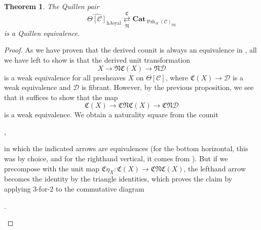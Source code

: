 \documentclass[a4paper]{article}
\numberwithin{equation}{subsection}
\theoremstyle{plain}   %
\newtheorem{thm}[equation]{Theorem}
\theoremstyle{definition}
\theoremstyle{remark}
\theoremstyle{plain}
\newcommand{\Cat}{\ensuremath{\mathbf{Cat}}}
\providecommand{\C}{}
\renewcommand{\C}{\ensuremath{\mathcal{C}}}
\newcommand{\cellset}{\ensuremath{\widehat{\Theta[\mathcal{C}]}}}
\newcommand{\spsh}{\ensuremath{\operatorname{Psh}_\Delta(\mathcal{C})}}
\begin{document}
\begin{thm}\label{mainthm1}
	The Quillen pair
	\[\cellset_{\mathrm{hJoyal}} \underset{\mathfrak{N}}{\overset{\mathfrak{C}}{\rightleftarrows}} \Cat_{\spsh_{\mathrm{inj}}}\]
	is a Quillen equivalence.
\end{thm}
\begin{proof}
	As we have proven that the derived counit is always an equivalence in , all we have left to show is that the derived unit transformation
	\[X\to \mathfrak{N}\mathfrak{C}(X) \to \mathfrak{N}\mathcal{D}\]
	is a weak equivalence for all presheaves \(X\) on \(\Theta[\C]\), where \(\mathfrak{C}(X) \to \mathcal{D}\) is a weak equivalence and \(\mathcal{D}\) is fibrant.  However, by the previous proposition, we see that it suffices to show that the map
	\[\mathfrak{C}(X)\to \mathfrak{C}\mathfrak{N}\mathfrak{C}(X) \to \mathfrak{C}\mathfrak{N}\mathcal{D}\]
	is a weak equivalence.  We obtain a naturality square from the counit
	\begin{center}
		,
	\end{center}
	in which the indicated arrows are equivalences (for the bottom horizontal, this was by choice, and for the righthand vertical, it comes from ).  But if we precompose with the unit map \(\mathfrak{C}\eta_X:\mathfrak{C}(X)\to \mathfrak{C}\mathfrak{N}\mathfrak{C}(X)\), the lefthand arrow becomes the identity by the triangle identities, which proves the claim by applying \(3\)-for-\(2\) to the commutative diagram
	\begin{center}
		.
	\end{center}
\end{proof}
\end{document}
